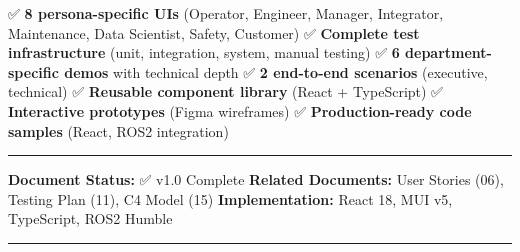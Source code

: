 \documentclass[
]{article}
\begin{document}
✅ \textbf{8 persona-specific UIs} (Operator, Engineer, Manager,
Integrator, Maintenance, Data Scientist, Safety, Customer) ✅
\textbf{Complete test infrastructure} (unit, integration, system, manual
testing) ✅ \textbf{6 department-specific demos} with technical depth ✅
\textbf{2 end-to-end scenarios} (executive, technical) ✅
\textbf{Reusable component library} (React + TypeScript) ✅
\textbf{Interactive prototypes} (Figma wireframes) ✅
\textbf{Production-ready code samples} (React, ROS2 integration)

\begin{center}\rule{0.5\linewidth}{0.5pt}\end{center}

\textbf{Document Status:} ✅ v1.0 Complete \textbf{Related Documents:}
User Stories (06), Testing Plan (11), C4 Model (15)
\textbf{Implementation:} React 18, MUI v5, TypeScript, ROS2 Humble

\begin{center}\rule{0.5\linewidth}{0.5pt}\end{center}
\end{document}
